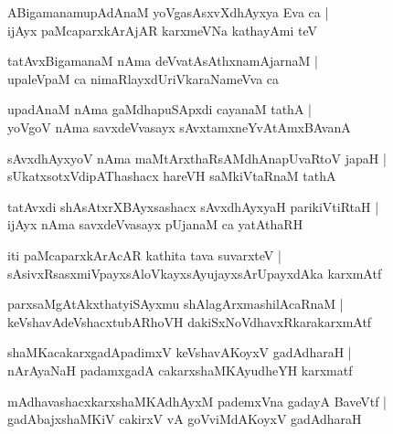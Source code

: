 \documentclass[twoside,12pt,openright]{book}
\newcounter{shloka}[chapter]
\begin{document}
\begin{shloka}%
ABigamanamupAdAnaM yoVgasAsxvXdhAyxya Eva ca |\\
ijAyx paMcaparxkArAjAR karxmeVNa kathayAmi teV 
\end{shloka}

\begin{shloka}%
tatAvxBigamanaM nAma deVvatAsAthxnamAjarnaM |\\
upaleVpaM ca nimaRlayxdUriVkaraNameVva ca 
\end{shloka}

\begin{shloka}%
upadAnaM nAma gaMdhapuSApxdi cayanaM tathA |\\
yoVgoV nAma savxdeVvasayx sAvxtamxneYvAtAmxBAvanA
\end{shloka}

\begin{shloka}%
sAvxdhAyxyoV nAma maMtArxthaRsAMdhAnapUvaRtoV japaH |\\
sUkatxsotxVdipAThashacx hareVH saMkiVtaRnaM tathA
\end{shloka}

\begin{shloka}%
tatAvxdi shAsAtxrXBAyxsashacx sAvxdhAyxyaH parikiVtiRtaH |\\
ijAyx nAma savxdeVvasayx pUjanaM ca yatAthaRH 
\end{shloka}

\begin{shloka}%
iti paMcaparxkArAcAR kathita tava suvarxteV |\\
sAsivxRsasxmiVpayxsAloVkayxsAyujayxsArUpayxdAka karxmAtf
\end{shloka}

\begin{shloka}%
parxsaMgAtAkxthatyiSAyxmu shAlagArxmashilAcaRnaM |\\
keVshavAdeVshacxtubARhoVH dakiSxNoVdhavxRkarakarxmAtf
\end{shloka}

\begin{shloka}%
shaMKacakarxgadApadimxV keVshavAKoyxV gadAdharaH |\\
nArAyaNaH padamxgadA cakarxshaMKAyudheYH karxmatf 
\end{shloka}

\begin{shloka}%
mAdhavashacxkarxshaMKAdhAyxM pademxVna gadayA BaveVtf |\\
gadAbajxshaMKiV cakirxV vA goVviMdAKoyxV gadAdharaH
\end{shloka}
\end{document}
